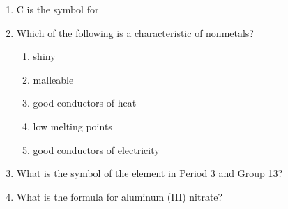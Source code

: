 \documentclass[main.tex]{subfiles}
\begin{document}
\begin{fullwidth}
\begin{multicols*}{2}
\begin{enumerate}
\item C is the symbol for 
\begin{enumerate}[label=(\alph*)]\vspace{-0.5cm}
\end{enumerate}\vspace{-0.5cm}

\item Which of the following is a characteristic of nonmetals?
\begin{enumerate}[label=(\alph*)] 
\item  shiny
\item  malleable
\item  good conductors of heat
\item  low melting points
\item  good conductors of electricity
\end{enumerate} 

\item What is the symbol of the element in Period 3 and Group 13?
\begin{enumerate}[label=(\alph*)]\vspace{-0.5cm}
\end{enumerate}\vspace{-0.5cm}

\item What is the formula for aluminum (III) nitrate?
\begin{enumerate}[label=(\alph*)]\vspace{-0.5cm}
\end{enumerate}\vspace{-0.5cm}


\end{enumerate}
\end{multicols*}
\end{fullwidth}
\end{document}
